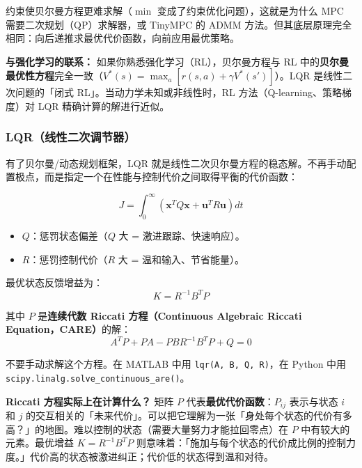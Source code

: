 约束使贝尔曼方程更难求解（$\min$ 变成了约束优化问题），这就是为什么 MPC 需要二次规划（QP）求解器，或 TinyMPC 的 ADMM 方法。但其底层原理完全相同：向后递推求最优代价函数，向前应用最优策略。

\textbf{与强化学习的联系：} 如果你熟悉强化学习（RL），贝尔曼方程与 RL 中的\textbf{贝尔曼最优性方程}完全一致（$V^*(s) = \max_a [r(s,a) + \gamma V^*(s')]$）。LQR 是线性二次问题的「闭式 RL」。当动力学未知或非线性时，RL 方法（Q-learning、策略梯度）对 LQR 精确计算的解进行近似。

\subsubsection{LQR（线性二次调节器）}

有了贝尔曼/动态规划框架，LQR 就是线性二次贝尔曼方程的稳态解。不再手动配置极点，而是指定一个在性能与控制代价之间取得平衡的代价函数：

\begin{equation}
J = \int_0^{\infty} \left( \mathbf{x}^T Q \mathbf{x} + \mathbf{u}^T R \mathbf{u} \right) dt
\end{equation}

\begin{itemize}
    \item $Q$：惩罚状态偏差（$Q$ 大 = 激进跟踪、快速响应）。
    \item $R$：惩罚控制代价（$R$ 大 = 温和输入、节省能量）。
\end{itemize}

最优状态反馈增益为：
\begin{equation}
K = R^{-1} B^T P
\end{equation}

其中 $P$ 是\textbf{连续代数 Riccati 方程（Continuous Algebraic Riccati Equation，CARE）}的解：
\begin{equation}
A^T P + PA - PBR^{-1}B^T P + Q = 0
\end{equation}

不要手动求解这个方程。在 MATLAB 中用 \texttt{lqr(A, B, Q, R)}，在 Python 中用 \texttt{scipy.linalg.solve\_continuous\_are()}。

\textbf{Riccati 方程实际上在计算什么？} 矩阵 $P$ 代表\textbf{最优代价函数}：$P_{ij}$ 表示与状态 $i$ 和 $j$ 的交互相关的「未来代价」。可以把它理解为一张「身处每个状态的代价有多高？」的地图。难以控制的状态（需要大量努力才能拉回零点）在 $P$ 中有较大的元素。最优增益 $K = R^{-1}B^T P$ 则意味着：「施加与每个状态的代价成比例的控制力度。」代价高的状态被激进纠正；代价低的状态得到温和对待。

